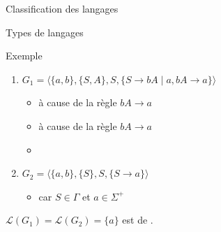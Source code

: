 \begin{frame}{Classification des langages}
\begin{minipage}{.5\textwidth}
\begin{block}{Types de langages}
{}
    \end{block}
  \end{minipage}

  \vspace{-1mm}
  \begin{exampleblock}{Exemple}
    \vspace{-2mm}
    \begin{enumerate}
    \item $G_1 = \langle \{a,b\}, \{S,A\}, S, \{ S \rightarrow  bA  \;|\;  a, bA \rightarrow a\}\rangle$\\
      \begin{itemize}
      \item  {} à cause de la règle $bA \rightarrow a$
      \item  {} à cause de la règle $bA \rightarrow a$
      \item  {}
      \end{itemize}
    \item $G_2 = \langle \{a,b\},\{S\},S,\{S \rightarrow a\}\rangle$
      \begin{itemize}
      \item {} car $S\in \Gamma$ et $a\in \Sigma^+$
      \end{itemize}
    \end{enumerate}
    $\mathcal{L}(G_1) = \mathcal{L}(G_2) = \{a\}$ est de .
  \end{exampleblock}

\end{frame}

\endgroup
\endinput
